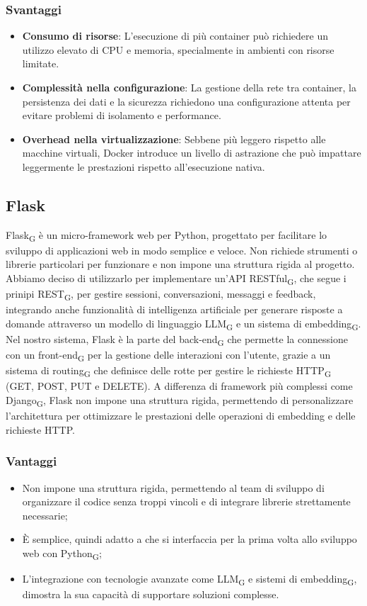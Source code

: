 \subsubsection{Svantaggi}
\begin{itemize}
    \item \textbf{Consumo di risorse}: L’esecuzione di più container può richiedere un utilizzo elevato di CPU e memoria, specialmente in ambienti con risorse limitate.
    \item \textbf{Complessità nella configurazione}: La gestione della rete tra container, la persistenza dei dati e la sicurezza richiedono una configurazione attenta per evitare problemi di isolamento e performance.
    \item \textbf{Overhead nella virtualizzazione}: Sebbene più leggero rispetto alle macchine virtuali, Docker introduce un livello di astrazione che può impattare leggermente le prestazioni rispetto all’esecuzione nativa.
\end{itemize}
\subsection{Flask}
Flask\textsubscript{G} è un micro-framework web per Python, progettato per facilitare lo sviluppo di applicazioni web in modo semplice e veloce. Non richiede strumenti o librerie particolari per funzionare e non impone una struttura rigida al progetto. Abbiamo deciso di utilizzarlo per implementare un'API RESTful\textsubscript{G}, che segue i prinipi REST\textsubscript{G}, per gestire sessioni, conversazioni, messaggi e feedback, integrando anche funzionalità di intelligenza artificiale per generare risposte a domande attraverso un modello di linguaggio LLM\textsubscript{G} e un sistema di embedding\textsubscript{G}. Nel nostro sistema, Flask è la parte del back-end\textsubscript{G} che permette la connessione con un front-end\textsubscript{G} per la gestione delle interazioni con l'utente, grazie a un sistema di routing\textsubscript{G} che definisce delle rotte per gestire le richieste HTTP\textsubscript{G} (GET, POST, PUT e DELETE). A differenza di framework più complessi come Django\textsubscript{G}, Flask non impone una struttura rigida, permettendo di personalizzare l'architettura per ottimizzare le prestazioni delle operazioni di embedding e delle richieste HTTP.
\subsubsection{Vantaggi}
\begin{itemize}
    \item Non impone una struttura rigida, permettendo al team di sviluppo di organizzare il codice senza troppi vincoli e di integrare librerie strettamente necessarie;
    \item È semplice, quindi adatto a che si interfaccia per la prima volta allo sviluppo web con Python\textsubscript{G};
    \item L'integrazione con tecnologie avanzate come LLM\textsubscript{G} e sistemi di embedding\textsubscript{G}, dimostra la sua capacità di supportare soluzioni complesse.
\end{itemize}
